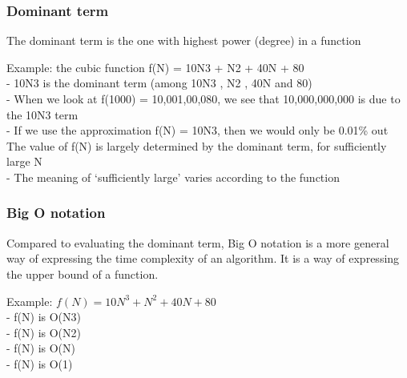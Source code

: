 \documentclass{article}
\begin{document}
\subsubsection{Dominant term}

The dominant term is the one with highest power (degree) in a function

Example: the cubic function f(N) = 10N3 + N2 + 40N + 80 \\

    - 10N3 is the dominant term (among 10N3 , N2 , 40N and 80) \\
    - When we look at f(1000) = 10,001,00,080, we see that 10,000,000,000 is due to the 10N3 term \\
    - If we use the approximation f(N) = 10N3, then we would only be 0.01\% out \\

The value of f(N) is largely determined by the dominant term, for sufficiently large N \\
    - The meaning of ‘sufficiently large’ varies according to the function \\


\subsubsection{Big O notation}

Compared to evaluating the dominant term, Big O notation is a more general way of expressing the time complexity of an algorithm. It is a way of expressing the upper bound of a function.

Example: $f(N) = 10N^3 + N^2 + 40N + 80$ \\
    - f(N) is O(N3) \\
    - f(N) is O(N2) \\
    - f(N) is O(N) \\
    - f(N) is O(1) \\

\end{document}
